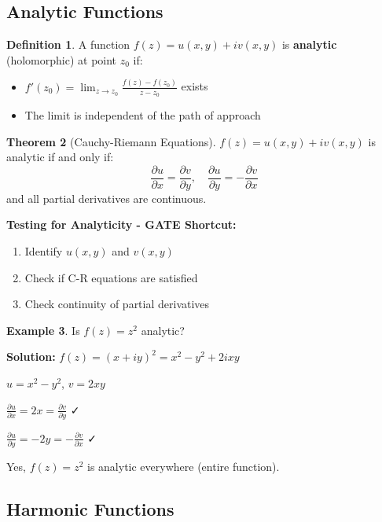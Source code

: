 \documentclass[12pt,a4paper]{article}
\theoremstyle{definition}
\newtheorem{theorem}{Theorem}[section]
\newtheorem{definition}[theorem]{Definition}
\newtheorem{example}[theorem]{Example}
\begin{document}
\subsection{Analytic Functions}

\begin{definition}
A function $f(z) = u(x,y) + iv(x,y)$ is \textbf{analytic} (holomorphic) at point $z_0$ if:
\begin{itemize}
    \item $f'(z_0) = \lim_{z \to z_0} \frac{f(z) - f(z_0)}{z - z_0}$ exists
    \item The limit is independent of the path of approach
\end{itemize}
\end{definition}

\begin{theorem}[Cauchy-Riemann Equations]
$f(z) = u(x,y) + iv(x,y)$ is analytic if and only if:
\[
\frac{\partial u}{\partial x} = \frac{\partial v}{\partial y}, \quad \frac{\partial u}{\partial y} = -\frac{\partial v}{\partial x}
\]
and all partial derivatives are continuous.
\end{theorem}

\begin{importantbox}
\textbf{Testing for Analyticity - GATE Shortcut:}
\begin{enumerate}
    \item Identify $u(x,y)$ and $v(x,y)$
    \item Check if C-R equations are satisfied
    \item Check continuity of partial derivatives
\end{enumerate}
\end{importantbox}

\begin{example}
Is $f(z) = z^2$ analytic?

\textbf{Solution:}
$f(z) = (x + iy)^2 = x^2 - y^2 + 2ixy$

$u = x^2 - y^2$, $v = 2xy$

$\frac{\partial u}{\partial x} = 2x = \frac{\partial v}{\partial y}$ ✓

$\frac{\partial u}{\partial y} = -2y = -\frac{\partial v}{\partial x}$ ✓

Yes, $f(z) = z^2$ is analytic everywhere (entire function).
\end{example}

\subsection{Harmonic Functions}
\end{document}
